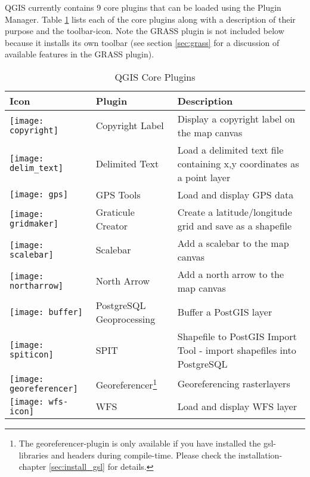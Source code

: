 QGIS currently contains 9 core plugins that can be loaded using the Plugin
Manager. Table \ref{tab:core_plugins} lists each of the core plugins along
with a description of their purpose and the toolbar-icon. 
Note the GRASS plugin is not included below
because it installs its own toolbar (see section \ref{sec:grass} for a
discussion of available features in the GRASS plugin).

\begin{minipage}{\textwidth}
\begin{table}[H]
\centering
\caption{QGIS Core Plugins}\label{tab:core_plugins}\medskip
\small
 \begin{tabular}{|l|l|p{4in}|}
\hline \textbf{Icon} & \textbf{Plugin} & \textbf{Description} \\
\hline 
\texttt{[image: copyright]} & Copyright Label \index{plugins!copyright}& Display a copyright label on the map canvas\\
\hline 
\texttt{[image: delim\_text]} & Delimited Text \index{plugins!delimited text}& Load a delimited text file containing x,y coordinates as a point layer \\
\hline 
\texttt{[image: gps]} & GPS Tools \index{plugins!gps}& Load and display GPS data \\
\hline 
\texttt{[image: gridmaker]} & Graticule Creator \index{plugins!graticule}& Create a latitude/longitude grid and save as a shapefile\\
\hline 
\texttt{[image: scalebar]} & Scalebar \index{plugins!scalebar}& Add a scalebar to the map canvas\\
\hline 
\texttt{[image: northarrow]}& North Arrow \index{plugins!north arrow}& Add a north arrow to the map canvas\\
\hline 
\texttt{[image: buffer]} & PostgreSQL Geoprocessing \index{plugins!geoprocessing}& Buffer a PostGIS layer \\
\hline 
\texttt{[image: spiticon]} & SPIT \index{plugins!SPIT}& Shapefile to PostGIS Import Tool - import shapefiles into PostgreSQL\\
\hline
\texttt{[image: georeferencer]} & Georeferencer\footnote{The georeferencer-plugin is only available if you have installed the gsl-libraries and headers during compile-time. Please check the installation-chapter \ref{sec:install_gsl} for details.} \index{plugin!Georeferencer} & Georeferencing rasterlayers \\
\hline
\texttt{[image: wfs-icon]} & WFS & Load and display WFS layer \\
\hline
\end{tabular}
\end{table}
\end{minipage}

